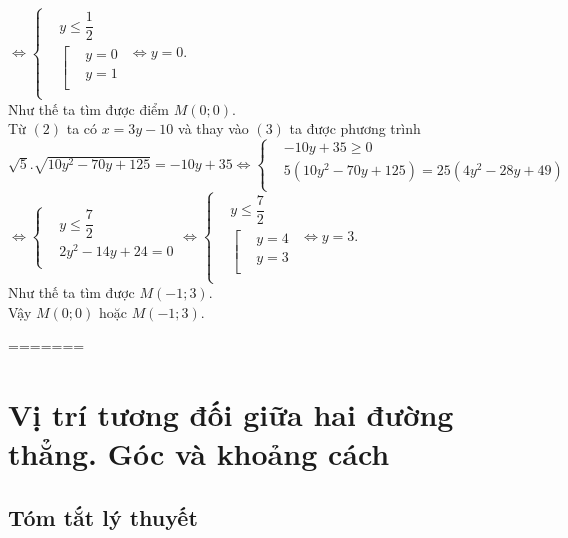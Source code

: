 \begin{ex}
{			$\Leftrightarrow \left\{ \begin{aligned}
				& y\le \dfrac{1}{2} \\ 
				& \left[ \begin{aligned}
					& y=0 \\ 
					& y=1 \\ 
				\end{aligned} \right. \\ 
			\end{aligned} \right.\Leftrightarrow y=0$.\\
			Như thế ta tìm được điểm $M\left( 0;0 \right)$.\\
			Từ $\left( 2 \right)$ ta có $ x=3y-10$ và thay vào $\left( 3 \right)$ ta được phương trình\\
			$\sqrt{5}.\sqrt{10y^2-70y+125}=-10y+35\Leftrightarrow \left\{ \begin{aligned}
				& -10y+35\ge 0 \\ 
				& 5\left( 10y^2-70y+125 \right)=25\left( 4y^2-28y+49 \right) \\ 
			\end{aligned} \right.$\\
			$\Leftrightarrow \left\{ \begin{aligned}
				& y\le \dfrac{7}{2} \\ 
				& 2y^2-14y+24=0 \\ 
			\end{aligned} \right.\Leftrightarrow \left\{ \begin{aligned}
				& y\le \dfrac{7}{2} \\ 
				& \left[ \begin{aligned}
					& y=4 \\ 
					& y=3 \\ 
				\end{aligned} \right. \\ 
			\end{aligned} \right.\Leftrightarrow y=3$.\\
			Như thế ta tìm được $M\left( -1;3 \right)$.\\
			Vậy $M\left( 0;0 \right)$ hoặc $M\left( -1;3 \right)$.}
	\end{ex}
=======
\newpage\setcounter{dang}{0}
\section{Vị trí tương đối giữa hai đường thẳng. Góc và khoảng cách}
\subsection{Tóm tắt lý thuyết}
